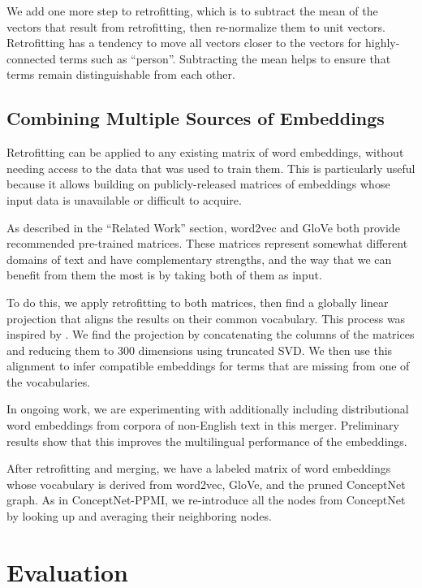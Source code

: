 \documentclass[letterpaper]{article}
\begin{document}
We add one more step to retrofitting, which is to subtract the mean of the
vectors that result from retrofitting, then re-normalize them to unit vectors.
Retrofitting has a tendency to move all vectors closer to the vectors for
highly-connected terms such as ``person''. Subtracting the mean helps to ensure
that terms remain distinguishable from each other.

\subsection{Combining Multiple Sources of Embeddings}

Retrofitting can be applied to any existing matrix of word embeddings, without
needing access to the data that was used to train them. This is particularly
useful because it allows building on publicly-released matrices of embeddings
whose input data is unavailable or difficult to acquire.

As described in the ``Related Work'' section, word2vec and GloVe both provide
recommended pre-trained matrices. These matrices represent somewhat different
domains of text and have complementary strengths, and the way that we can
benefit from them the most is by taking both of them as input.

To do this, we apply retrofitting to both matrices, then find a globally
linear projection that aligns the results on their common vocabulary.
This process was inspired by \citeauthor{zhao2015learning} .
We find the projection by concatenating the columns of the matrices and reducing
them to 300 dimensions using truncated SVD. We then use this alignment to infer
compatible embeddings for terms that are missing from one of the vocabularies.

In ongoing work, we are experimenting with additionally including
distributional word embeddings from corpora of non-English text in this merger.
Preliminary results show that this improves the multilingual performance of the
embeddings.

After retrofitting and merging, we have a labeled matrix of word embeddings
whose vocabulary is derived from word2vec, GloVe, and the pruned ConceptNet
graph. As in ConceptNet-PPMI, we re-introduce all the nodes from ConceptNet by
looking up and averaging their neighboring nodes.

\section{Evaluation}
\end{document}
